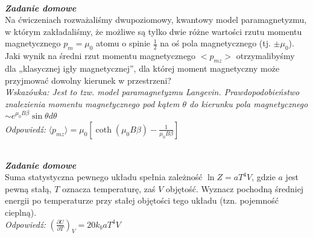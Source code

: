 \documentclass[11pt,a4paper]{article}
\newcounter{zaddom}\newcommand{\zaddom}[1][]{\addtocounter{zaddom}{1} ~\\  {\bf \emph{Zadanie domowe \arabic{zaddom} #1 }} \\}
\begin{document}
%

\zaddom
Na ćwiczeniach rozważaliśmy dwupoziomowy, kwantowy model paramagnetyzmu, w którym
zakładaliśmy, że możliwe są tylko dwie różne wartości rzutu momentu magnetycznego
$p_m = \mu_0$
atomu o spinie $\frac{1}{2}$ na oś pola magnetycznego (tj. $\pm \mu_0$).
Jaki wynik na średni rzut momentu magnetycznego $<p_{mz} >$
otrzymalibyśmy dla „klasycznej igły magnetycznej”, dla której
moment magnetyczny może przyjmować dowolny kierunek w przestrzeni?\\
\textit{Wskazówka: Jest to tzw. model paramagnetyzmu Langevin. Prawdopodobieństwo znalezienia momentu magnetycznego pod kątem $\theta$ do kierunku pola magnetycznego} $\sim e^{\mu_0B \beta} \sin \theta d \theta$
\\
\textit{Odpowiedź:} $\langle p_{mz} \rangle=\mu_0 [\coth (\mu_0 B \beta)-\frac{1}{\mu_0B \beta} ]$

\zaddom
Suma statystyczna pewnego układu spełnia zależność $\ln{Z} = a T^4 V$,
gdzie $a$ jest pewną stałą, $T$ oznacza temperaturę, zaś $V$ objętość.
Wyznacz pochodną średniej energii po temperaturze przy stałej objętości
tego układu (tzn. pojemność cieplną).
\\
\textit{Odpowiedź:} $\left(\frac{\partial U}{\partial T}\right)_V=20k_baT^4V$


\end{document}
